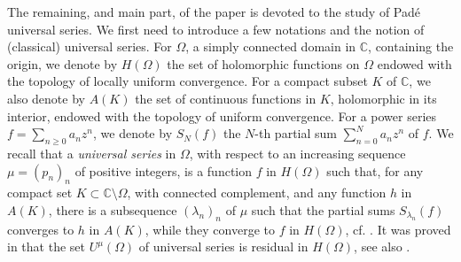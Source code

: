 \documentclass[12pt]{amsart}
\numberwithin{equation}{section}
\begin{document}
The remaining, and main part, of the paper is devoted to the study of Pad\'e universal series. We first need to introduce a few notations and the notion of (classical) universal series.
For $\Omega$, a simply connected domain in ${\mathbb{C}}$, containing the origin, we denote by $H(\Omega)$ the set of holomorphic functions on $\Omega$ endowed with the topology of locally uniform convergence. For a compact subset $K$ of ${\mathbb{C}}$, 
we also denote by $A(K)$ the set of continuous functions in $K$, holomorphic in its interior, endowed with the topology of uniform convergence. For a power series 
$f=\sum_{n\geq 0}a_{n}z^{n}$, we denote by $S_{N}(f)$ the $N$-th partial sum 
$\sum_{n= 0}^{N}a_{n}z^{n}$ of $f$.
We recall that a {\it universal series} in $\Omega$, with respect to an increasing sequence $\mu=(p_{n})_{n}$ of positive integers, is a function $f$ in $H(\Omega)$ such that, for any compact set $K\subset{\mathbb{C}} \setminus \Omega$, with connected complement, and any function $h$ in $A(K)$, there is a subsequence $(\lambda_{n})_{n}$ of $\mu$ such that the partial sums $S_{\lambda_{n}}(f)$ converges to $h$ in $A(K)$, while they converge to $f$ in $H(\Omega)$, cf. \cite{bgnp,Luh2,Nes}.
It was proved in \cite{Nes2} that the set $U^{\mu}(\Omega)$ of universal series is residual in $H(\Omega)$, see also \cite{Nes}. 
\end{document}
